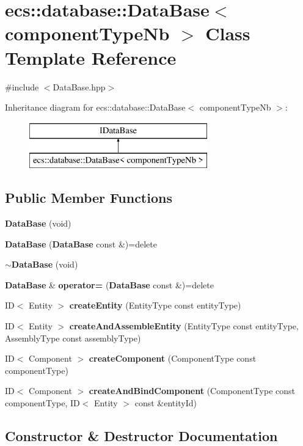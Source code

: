 \section{ecs\+:\+:database\+:\+:Data\+Base$<$ component\+Type\+Nb $>$ Class Template Reference}
\label{classecs_1_1database_1_1_data_base}


{\ttfamily \#include $<$Data\+Base.\+hpp$>$}

Inheritance diagram for ecs\+:\+:database\+:\+:Data\+Base$<$ component\+Type\+Nb $>$\+:\begin{figure}[H]
\begin{center}
\leavevmode
\includegraphics[height=2.000000cm]{d6/ddd/classecs_1_1database_1_1_data_base}
\end{center}
\end{figure}
\subsection*{Public Member Functions}
\begin{DoxyCompactItemize}
\item 
{\bf Data\+Base} (void)
\item 
{\bf Data\+Base} ({\bf Data\+Base} const \&)=delete
\item 
{\bf $\sim$\+Data\+Base} (void)
\item 
{\bf Data\+Base} \& {\bf operator=} ({\bf Data\+Base} const \&)=delete
\item 
ID$<$ Entity $>$ {\bf create\+Entity} (Entity\+Type const entity\+Type)
\item 
ID$<$ Entity $>$ {\bf create\+And\+Assemble\+Entity} (Entity\+Type const entity\+Type, Assembly\+Type const assembly\+Type)
\item 
ID$<$ Component $>$ {\bf create\+Component} (Component\+Type const component\+Type)
\item 
ID$<$ Component $>$ {\bf create\+And\+Bind\+Component} (Component\+Type const component\+Type, ID$<$ Entity $>$ const \&entity\+Id)
\end{DoxyCompactItemize}


\subsection{Constructor \& Destructor Documentation}
\label{classecs_1_1database_1_1_data_base_a871d8e2646bdd28a7798922028eac188} 
